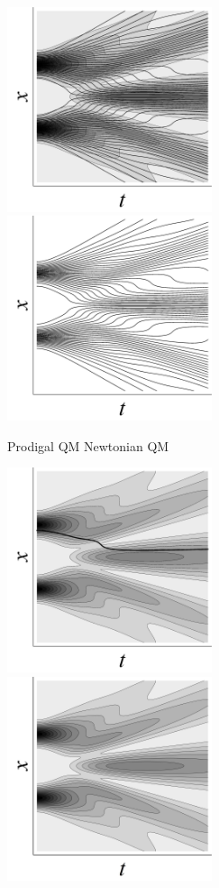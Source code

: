 \documentclass[12pt,secnumarabic,balancelastpage,amsmath,amssymb,nofootinbib]{article}
\begin{document}
\begin{figure}[h!]
\centerline{\includegraphics[width=6cm]{ProdigalQMBlackandWhite.jpg}\ \ \ \ \ \ \includegraphics[width=6cm]{NewtonianQMBlackandWhite.jpg}}
\vspace*{-4 pt}
\large{\hspace*{3 cm} Prodigal QM \hspace{3.9 cm} Newtonian QM}\vspace*{8 pt}\\
\centerline{\includegraphics[width=6cm]{BohmianQMBlackandWhite.jpg}\ \ \ \ \ \ \includegraphics[width=6cm]{EverettianQMBlackandWhite.jpg}}\vspace*{-4 pt}

\end{figure}
\end{document}
